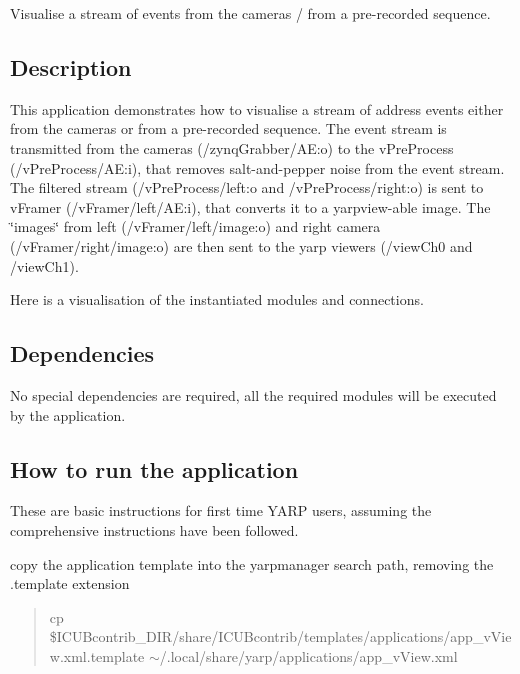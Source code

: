 Visualise a stream of events from the cameras / from a pre-\/recorded sequence.

\subsection*{Description}

This application demonstrates how to visualise a stream of address events either from the cameras or from a pre-\/recorded sequence. The event stream is transmitted from the cameras (/zynq\+Grabber/\+AE\+:o) to the v\+Pre\+Process (/v\+Pre\+Process/\+AE\+:i), that removes salt-\/and-\/pepper noise from the event stream. The filtered stream (/v\+Pre\+Process/left\+:o and /v\+Pre\+Process/right\+:o) is sent to v\+Framer (/v\+Framer/left/\+AE\+:i), that converts it to a yarpview-\/able image. The \char`\"{}images\char`\"{} from left (/v\+Framer/left/image\+:o) and right camera (/v\+Framer/right/image\+:o) are then sent to the yarp viewers (/view\+Ch0 and /view\+Ch1).

Here is a visualisation of the instantiated modules and connections.



\subsection*{Dependencies}

No special dependencies are required, all the required modules will be executed by the application.

\subsection*{How to run the application}

These are basic instructions for first time Y\+A\+RP users, assuming the comprehensive instructions have been followed.


\begin{DoxyItemize}
\item copy the application template into the yarpmanager search path, removing the .template extension
\end{DoxyItemize}

\begin{quote}
cp \$\+I\+C\+U\+Bcontrib\+\_\+\+D\+IR/share/\+I\+C\+U\+Bcontrib/templates/applications/app\+\_\+v\+View.xml.\+template $\sim$/.local/share/yarp/applications/app\+\_\+v\+View.\+xml \end{quote}



